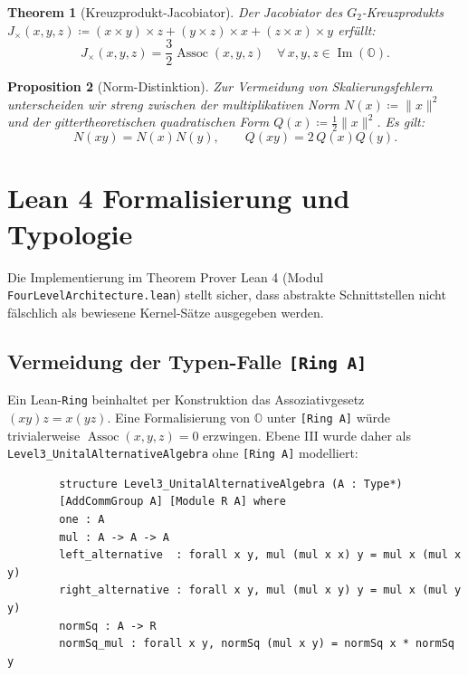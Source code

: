 \documentclass[11pt,a4paper]{article}
\newtheorem{theorem}{Theorem}[section]
\newtheorem{proposition}[theorem]{Proposition}
\theoremstyle{definition}
\newcommand{\Oalg}{\mathbb{O}}
\newcommand{\ImO}{\operatorname{Im}(\mathbb{O})}
\newcommand{\Assoc}{\operatorname{Assoc}}
\begin{document}
	\begin{theorem}[Kreuzprodukt-Jacobiator]
		Der Jacobiator des $G_2$-Kreuzprodukts $J_\times(x,y,z) \coloneqq (x \times y) \times z + (y \times z) \times x + (z \times x) \times y$ erfüllt:
		\begin{equation}
			J_\times(x,y,z) = \frac{3}{2} \Assoc(x,y,z) \quad \forall\, x,y,z \in \ImO.
		\end{equation}
	\end{theorem}
	
	\begin{proposition}[Norm-Distinktion]
		Zur Vermeidung von Skalierungsfehlern unterscheiden wir streng zwischen der multiplikativen Norm $N(x) \coloneqq \|x\|^2$ und der gittertheoretischen quadratischen Form $Q(x) \coloneqq \frac{1}{2}\|x\|^2$. Es gilt:
		\begin{equation}
			N(xy) = N(x) N(y), \qquad Q(xy) = 2 \, Q(x) Q(y).
		\end{equation}
	\end{proposition}
	
	\section{Lean 4 Formalisierung und Typologie}
	
	Die Implementierung im Theorem Prover Lean 4 (Modul \texttt{FourLevelArchitecture.lean}) stellt sicher, dass abstrakte Schnittstellen nicht fälschlich als bewiesene Kernel-Sätze ausgegeben werden.
	
	\subsection{Vermeidung der Typen-Falle \texttt{[Ring A]}}
	Ein Lean-\texttt{Ring} beinhaltet per Konstruktion das Assoziativgesetz $(xy)z = x(yz)$. Eine Formalisierung von $\Oalg$ unter \texttt{[Ring A]} würde trivialerweise $\Assoc(x,y,z) = 0$ erzwingen. Ebene III wurde daher als \texttt{Level3\_UnitalAlternativeAlgebra} ohne \texttt{[Ring A]} modelliert:
	
	\begin{verbatim}
		structure Level3_UnitalAlternativeAlgebra (A : Type*)
		[AddCommGroup A] [Module R A] where
		one : A
		mul : A -> A -> A
		left_alternative  : forall x y, mul (mul x x) y = mul x (mul x y)
		right_alternative : forall x y, mul (mul x y) y = mul x (mul y y)
		normSq : A -> R
		normSq_mul : forall x y, normSq (mul x y) = normSq x * normSq y
	\end{verbatim}
	
\end{document}
